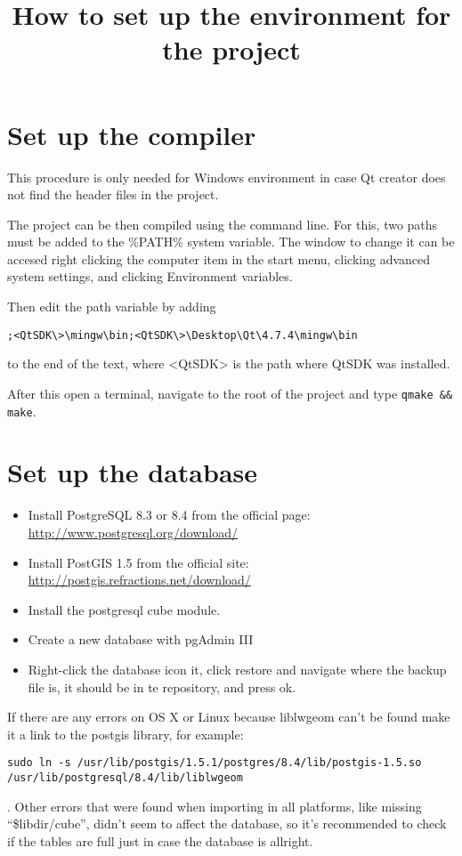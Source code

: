 \documentclass[12pt]{article}
\title{How to set up the environment for the project}
\begin{document}
\maketitle

\section{Set up the compiler}

	This procedure is only needed for Windows environment in case Qt creator does not find the header files in the project.

	The project can be then compiled using the command line.
	For this, two paths must be added to the \%PATH\% system variable.
	The window to change it can be accesed right clicking the computer item in the start menu, clicking advanced system settings, and clicking Environment variables.

	Then edit the path variable by adding
	\begin{verbatim};<QtSDK\>\mingw\bin;<QtSDK\>\Desktop\Qt\4.7.4\mingw\bin\end{verbatim} to the end of the text, where \textless{}QtSDK\textgreater{} is the path where QtSDK was installed.

	After this open a terminal, navigate to the root of the project and type \texttt{qmake \&\& make}.

\section{Set up the database}
\begin{itemize}
	\item Install PostgreSQL 8.3 or 8.4 from the official page: \url{http://www.postgresql.org/download/}
	\item Install PostGIS 1.5 from the official site: \url{http://postgis.refractions.net/download/}
	\item Install the postgresql cube module.
	\item Create a new database with pgAdmin III
	\item Right-click the database icon it, click restore and navigate where the backup file is, it should be in te repository, and press ok.
\end{itemize}
If there are any errors on OS X or Linux because liblwgeom can't be found make it a link to the postgis library, for example: \begin{verbatim}sudo ln -s /usr/lib/postgis/1.5.1/postgres/8.4/lib/postgis-1.5.so /usr/lib/postgresql/8.4/lib/liblwgeom\end{verbatim}. Other errors that were found when importing in all platforms, like missing ``\$libdir/cube'', didn't seem to affect the database, so it's recommended to check if the tables are full just in case the database is allright.
\end{document}
